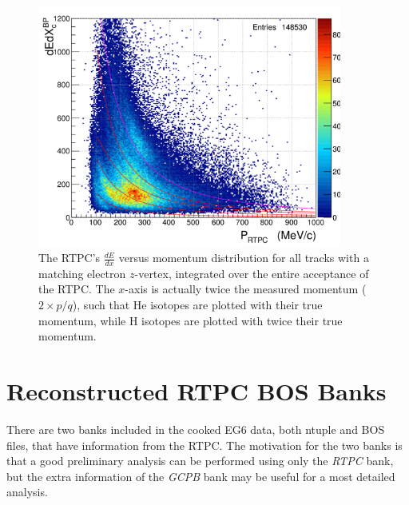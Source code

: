 \documentclass[amsmath,amssymb,notitlepage,12pt]{revtex4-1}
\begin{document}
\begin{figure}[htbp]\centering
    \includegraphics[width=10cm]{Left_dedxp_small.png}
    \caption{The RTPC's $\frac{dE}{dx}$ versus momentum distribution for all tracks with a matching electron $z$-vertex, integrated over the entire acceptance of the RTPC.  The $x$-axis is actually twice the measured momentum ($2\times p/q$), such that He isotopes are plotted with their true momentum, while H isotopes are plotted with twice their true momentum. \label{fig:dedx5pass2_all}}
\end{figure}

\newpage
\appendix{}
\section{Reconstructed RTPC BOS Banks}
There are two banks included in the cooked EG6 data, both ntuple and BOS files, that have information from the RTPC.
The motivation for the two banks is that a good preliminary analysis can be performed using only the {\it RTPC} bank, but the extra information of the {\it GCPB} bank may be useful for a most detailed analysis. 
\end{document}
